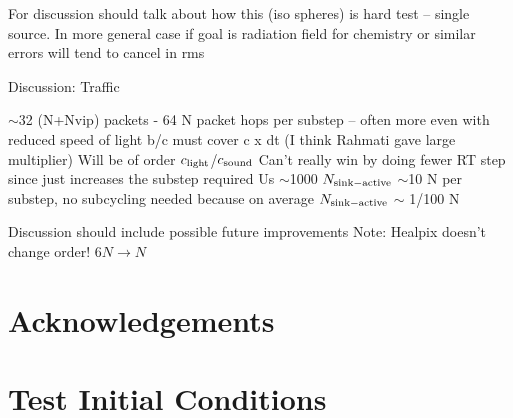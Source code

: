 \documentclass[fleq,usenatbib]{mnras}
\begin{document}
For discussion should talk about how this (iso spheres) is hard test -- single 
source.  In more general case if goal is radiation field for chemistry or 
similar errors will tend to cancel in rms

Discussion:   Traffic

$\sim$32 (N+Nvip) packets
- 64 N packet hops per substep 
-- often more even with reduced speed of light b/c must cover c x dt 
(I think Rahmati gave large multiplier)
Will be of order $c_{\rm light}$/$c_{\rm sound}$
Can't really win by doing fewer RT step since just increases the substep 
required
Us $\sim$1000 $N_{\rm sink-active}$ $\sim$10 N per substep, no subcycling needed because on average $N_{\rm sink-active}$ $\sim$ 1/100 N

Discussion should include possible future improvements 
Note: Healpix doesn't change order!
$6N \rightarrow N$


\section*{Acknowledgements}\label{sec:ackn}








\appendix
\section{Test Initial Conditions}\label{sec:icnd}
\end{document}
